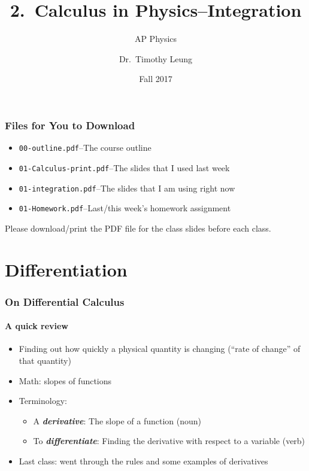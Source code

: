 \documentclass[12pt,compress,aspectratio=169]{beamer}
\title{2.\ Calculus in Physics--Integration}
\subtitle{AP Physics}
\author[TML]{Dr.\ Timothy Leung}
\institute{Olympiads School}
\date{Fall 2017}
\begin{document}
\begin{frame}
  \frametitle{Files for You to Download}
  \begin{itemize}
  \item\texttt{00-outline.pdf}--The course outline
  \item\texttt{01-Calculus-print.pdf}--The slides that I used last week
  \item\texttt{01-integration.pdf}--The slides that I am using right now
  \item\texttt{01-Homework.pdf}--Last/this week's homework assignment
  \end{itemize}
  Please download/print the PDF file for the class slides before each class.
\end{frame}

\section{Differentiation}

\begin{frame}
  \frametitle{On Differential Calculus}
  \framesubtitle{A quick review}
  \begin{itemize}
  \item Finding out how quickly a physical quantity is changing (``rate of
    change'' of that quantity)
  \item Math: slopes of functions
  \item Terminology:
    \begin{itemize}
    \item A \textbf{\emph{derivative}}: The slope of a function (noun)
    \item To \textbf{\emph{differentiate}}: Finding the derivative with respect
      to a variable (verb)
    \end{itemize}
  \item Last class: went through the rules and some examples of derivatives
  \end{itemize}
\end{frame}
\end{document}
